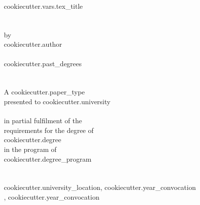 

\begin{titlepage}
\centering

{{cookiecutter.vars.tex_title}} \\ ~ \\ ~ \\

by \\
{{cookiecutter.author}} \\ ~ \\
{{cookiecutter.past_degrees}} \\ ~ \\ ~ \\

A {{cookiecutter.paper_type}} \\
presented to {{cookiecutter.university}} \\ ~ \\
in partial fulfilment of the \\
requirements for the degree of \\
{{cookiecutter.degree}} \\
in the program of \\
{{cookiecutter.degree_program}} \\ ~ \\ ~ \\

{{cookiecutter.university_location}}, {{cookiecutter.year_convocation}} \\
, {{cookiecutter.year_convocation}}

\end{titlepage}
